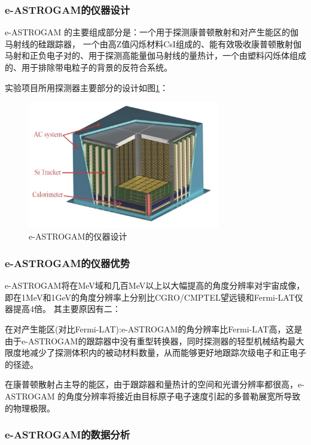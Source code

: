 \subsubsection{e-ASTROGAM的仪器设计}
e-ASTROGAM 的主要组成部分是：一个用于探测康普顿散射和对产生能区的伽马射线的硅跟踪器，
一个由高Z值闪烁材料CsI组成的、能有效吸收康普顿散射伽马射和正负电子对的、用于探测高能量伽马射线的量热计，一个由塑料闪烁体组成的、用于排除带电粒子的背景的反符合系统。\par
实验项目所用探测器主要部分的设计如图\ref{fig:e-ASTROGAM}：
\begin{figure}[H]
	\centering
	\includegraphics[width=0.75\textwidth]{figures/e-ASTROGAM实验设备具体.png}
	\caption{e-ASTROGAM的仪器设计} \label{fig:e-ASTROGAM}
\end{figure}

\subsubsection{e-ASTROGAM的仪器优势}
e-ASTROGAM将在MeV域和几百MeV以上以大幅提高的角度分辨率对宇宙成像，即在1MeV和1GeV的角度分辨率上分别比CGRO/CMPTEL望远镜和Fermi-LAT仪器提高4倍。
其主要原因有二：\par
在对产生能区(对比Fermi-LAT):e-ASTROGAM的角分辨率比Fermi-LAT高，这是由于e-ASTROGAM的跟踪器中没有重型转换器，同时探测器的轻型机械结构最大限度地减少了探测体积内的被动材料数量，从而能够更好地跟踪次级电子和正电子的径迹。\par
在康普顿散射占主导的能区，由于跟踪器和量热计的空间和光谱分辨率都很高，e-ASTROGAM 的角度分辨率将接近由目标原子电子速度引起的多普勒展宽所导致的物理极限。
\subsubsection{e-ASTROGAM的数据分析}



